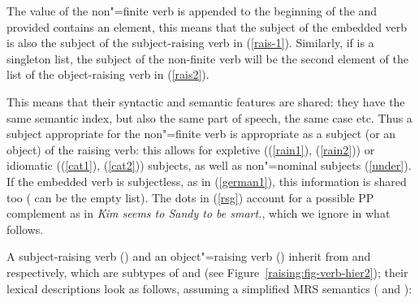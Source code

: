 \eal
\label{rsg}
\ex {} \impl
\avm{ [ \argst  \1 \+ < \ldots, [subj & \1 ] >  ]} \label{rais-1}
\ex {}  \impl
\avm{ [ \argst  < NP > \+ \1 \+ < [subj & \1 ] > ]} \label{rais2}
\zl

\noindent
The \subj value of the non"=finite verb is appended to the beginning of the \argst and provided
 contains an element, this means that the subject of the embedded verb is also the subject
of the subject-raising verb in (\ref{rais-1}). Similarly, if  is a singleton list, the subject of the
non-finite verb will be the second element of the \argst list of the object-raising verb in (\ref{rais2}).

This means that  their syntactic and semantic features are shared: they have the
same semantic index, but also the same part of speech, the same case etc. Thus a subject appropriate for the
non"=finite verb is appropriate as a subject (or an object) of the raising verb: this allows for
expletive ((\ref{rain1}), (\ref{rain2})) or idiomatic ((\ref{cat1}), (\ref{cat2})) subjects, as well
as non"=nominal subjects (\ref{under}). If the embedded verb is subjectless, as in (\ref{german1}),
this information is shared too ( can be the empty list). The dots in (\ref{rsg}) account for
a possible PP complement as in \textit{Kim seems to Sandy to be smart.}, which we ignore in what
follows.

A subject-raising verb () and an object"=raising verb () inherit from
 and 
 respectively, which are subtypes of  and  (see Figure~\ref{raising:fig-verb-hier2}); their lexical descriptions look as follows,
assuming a simplified MRS semantics (\citealp{CFPS2005a} and ):

